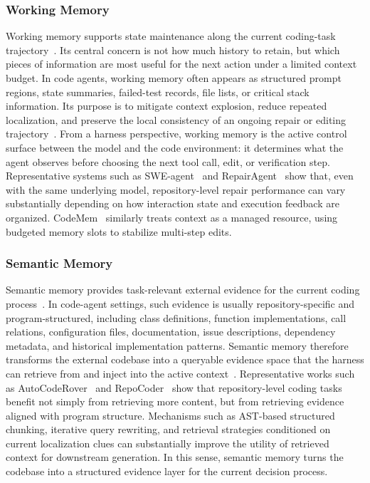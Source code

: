 \documentclass{llmxive}
\begin{document}
\subsubsection{Working Memory}
Working memory supports state maintenance along the current coding-task trajectory~\cite{huang2025language}. Its central concern is not how much history to retain, but which pieces of information are most useful for the next action under a limited context budget. In code agents, working memory often appears as structured prompt regions, state summaries, failed-test records, file lists, or critical stack information. Its purpose is to mitigate context explosion, reduce repeated localization, and preserve the local consistency of an ongoing repair or editing trajectory~\cite{yang2024swe,xia2025live,bouzenia2025repairagent,gaurav2025codemem}. 
From a harness perspective, working memory is the active control surface between the model and the code environment: it determines what the agent observes before choosing the next tool call, edit, or verification step. Representative systems such as SWE-agent~\cite{yang2024swe} and RepairAgent~\cite{bouzenia2025repairagent} show that, even with the same underlying model, repository-level repair performance can vary substantially depending on how interaction state and execution feedback are organized. CodeMem~\cite{gaurav2025codemem} similarly treats context as a managed resource, using budgeted memory slots to stabilize multi-step edits.



\subsubsection{Semantic Memory}
Semantic memory provides task-relevant external evidence for the current coding process~\cite{wu2025human,huang2026rethinking}. In code-agent settings, such evidence is usually repository-specific and program-structured, including class definitions, function implementations, call relations, configuration files, documentation, issue descriptions, dependency metadata, and historical implementation patterns. Semantic memory therefore transforms the external codebase into a queryable evidence space that the harness can retrieve from and inject into the active context~\cite{zhang2024autocoderover,zhang2024codeagent,biswal2026agentsm,zhang2025coderag,phan2025repohyper}. 
Representative works such as AutoCodeRover~\cite{zhang2024autocoderover} and RepoCoder~\cite{zhang2023repocoder} show that repository-level coding tasks benefit not simply from retrieving more content, but from retrieving evidence aligned with program structure. Mechanisms such as AST-based structured chunking, iterative query rewriting, and retrieval strategies conditioned on current localization clues can substantially improve the utility of retrieved context for downstream generation. In this sense, semantic memory turns the codebase into a structured evidence layer for the current decision process.
\end{document}
